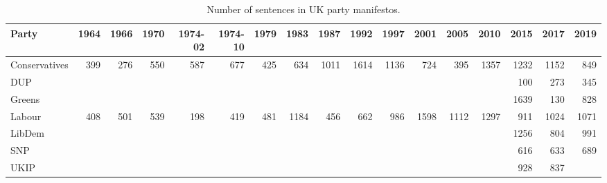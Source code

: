 \begin{table}[!t]

\caption{\label{tab:num_sentences_uk-manifestos}Number of sentences in UK party manifestos.}
\centering
\fontsize{10}{12}\selectfont
\begin{tabular}[t]{lrrrrrrrrrrrrrrrr}
\toprule
Party & 1964 & 1966 & 1970 & 1974-02 & 1974-10 & 1979 & 1983 & 1987 & 1992 & 1997 & 2001 & 2005 & 2010 & 2015 & 2017 & 2019\\
\midrule
Conservatives & 399 & 276 & 550 & 587 & 677 & 425 & 634 & 1011 & 1614 & 1136 & 724 & 395 & 1357 & 1232 & 1152 & 849\\
DUP &  &  &  &  &  &  &  &  &  &  &  &  &  & 100 & 273 & 345\\
Greens &  &  &  &  &  &  &  &  &  &  &  &  &  & 1639 & 130 & 828\\
Labour & 408 & 501 & 539 & 198 & 419 & 481 & 1184 & 456 & 662 & 986 & 1598 & 1112 & 1297 & 911 & 1024 & 1071\\
LibDem &  &  &  &  &  &  &  &  &  &  &  &  &  & 1256 & 804 & 991\\
SNP &  &  &  &  &  &  &  &  &  &  &  &  &  & 616 & 633 & 689\\
UKIP &  &  &  &  &  &  &  &  &  &  &  &  &  & 928 & 837 & \\
\bottomrule
\end{tabular}
\end{table}
